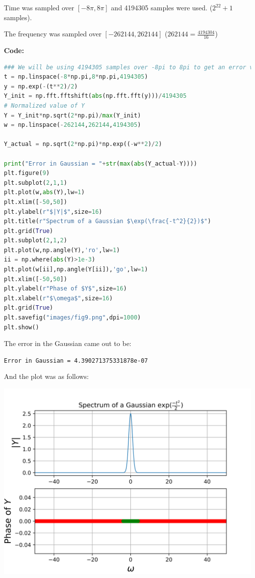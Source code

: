 \documentclass[12pt]{article}
\begin{document}
Time was sampled over $[-8\pi,8\pi]$ and 4194305 samples were used. ($2^22 + 1$ samples).

The frequency was sampled over $[-262144,262144]$ ($262144 = \frac{4194304}{16}$)

\textbf{Code:}
\begin{lstlisting}[language=Python]
### We will be using 4194305 samples over -8pi to 8pi to get an error value less than 1e-6
t = np.linspace(-8*np.pi,8*np.pi,4194305)
y = np.exp(-(t**2)/2)
Y_init = np.fft.fftshift(abs(np.fft.fft(y)))/4194305
# Normalized value of Y
Y = Y_init*np.sqrt(2*np.pi)/max(Y_init)
w = np.linspace(-262144,262144,4194305)

Y_actual = np.sqrt(2*np.pi)*np.exp((-w**2)/2)

print("Error in Gaussian = "+str(max(abs(Y_actual-Y))))
plt.figure(9)
plt.subplot(2,1,1)
plt.plot(w,abs(Y),lw=1)
plt.xlim([-50,50])
plt.ylabel(r"$|Y|$",size=16)
plt.title(r"Spectrum of a Gaussian $\exp(\frac{-t^2}{2})$")
plt.grid(True)
plt.subplot(2,1,2)
plt.plot(w,np.angle(Y),'ro',lw=1)
ii = np.where(abs(Y)>1e-3)
plt.plot(w[ii],np.angle(Y[ii]),'go',lw=1)
plt.xlim([-50,50])
plt.ylabel(r"Phase of $Y$",size=16)
plt.xlabel(r"$\omega$",size=16)
plt.grid(True)
plt.savefig("images/fig9.png",dpi=1000)
plt.show()
\end{lstlisting}

The error in the Gaussian came out to be:

\texttt{Error in Gaussian = 4.390271375331878e-07}

And the plot was as follows:

\begin{center}
    \includegraphics[scale=1]{images/fig9.png}
\end{center}
\end{document}
